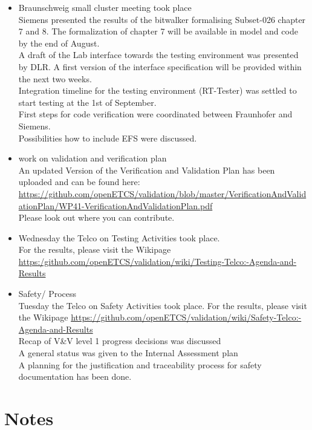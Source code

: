 \documentclass[a4paper, 11pt]{article}
\begin{document}
\begin{itemize}
\item Braunschweig small cluster meeting took place\\
Siemens presented the results of the bitwalker formalising Subset-026 chapter 7 and 8.
The formalization of chapter 7 will be available in model and code by the end of August.\\
A draft of the Lab interface towards the testing environment was presented by DLR. A first version of the interface specification will be provided within the next two weeks.\\
Integration timeline for the testing environment (RT-Tester) was settled to start testing at the 1st of September.\\
First steps for code verification were coordinated between Fraunhofer and Siemens.\\
Possibilities how to include EFS were discussed.\\

\item work on validation and verification plan\\
An updated Version of the Verification and Validation Plan has been uploaded and can be found here:
\url{https://github.com/openETCS/validation/blob/master/VerificationAndValidationPlan/WP41-VerificationAndValidationPlan.pdf}\\
Please look out where you can contribute.

\item Wednesday the Telco on Testing Activities took place.\\
For the results, please visit the Wikipage \url{https:/github.com/openETCS/validation/wiki/Testing-Telco:-Agenda-and-Results}\\

\item Safety/ Process\\
Tuesday the Telco on Safety Activities took place. For the results, please visit the Wikipage \url{https://github.com/openETCS/validation/wiki/Safety-Telco:-Agenda-and-Results}\\
Recap of V\&V level 1 progress decisions was discussed\\
A general status was given to the Internal Assessment plan\\
A planning for the justification and traceability process for safety documentation has been done.

\end{itemize}


\section{Notes}
\end{document}
